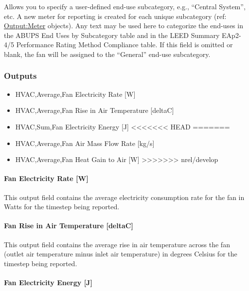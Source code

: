 Allows you to specify a user-defined end-use subcategory, e.g., ``Central System'', etc. A new meter for reporting is created for each unique subcategory (ref: \hyperref[outputmeter-and-outputmetermeterfileonly]{Output:Meter} objects). Any text may be used here to categorize the end-uses in the ABUPS End Uses by Subcategory table and in the LEED Summary EAp2-4/5 Performance Rating Method Compliance table. If this field is omitted or blank, the fan will be assigned to the ``General'' end-use subcategory.

\subsubsection{Outputs}\label{outputs-2-009}

\begin{itemize}
\item
  HVAC,Average,Fan Electricity Rate {[}W{]}
\item
  HVAC,Average,Fan Rise in Air Temperature {[}deltaC{]}
\item
  HVAC,Sum,Fan Electricity Energy {[}J{]}
<<<<<<< HEAD
=======
\item
  HVAC,Average,Fan Air Mass Flow Rate {[}kg/s{]}
\item
  HVAC,Average,Fan Heat Gain to Air {[}W{]}
>>>>>>> nrel/develop
\end{itemize}

\paragraph{Fan Electricity Rate {[}W{]}}\label{fan-electric-power-w-2}

This output field contains the average electricity consumption rate for the fan in Watts for the timestep being reported.

\paragraph{Fan Rise in Air Temperature {[}deltaC{]}}\label{fan-rise-in-air-temperature-deltac-2}

This output field contains the average rise in air temperature across the fan (outlet air temperature minus inlet air temperature) in degrees Celsius for the timestep being reported.

\paragraph{Fan Electricity Energy {[}J{]}}\label{fan-electric-energy-j-2}


